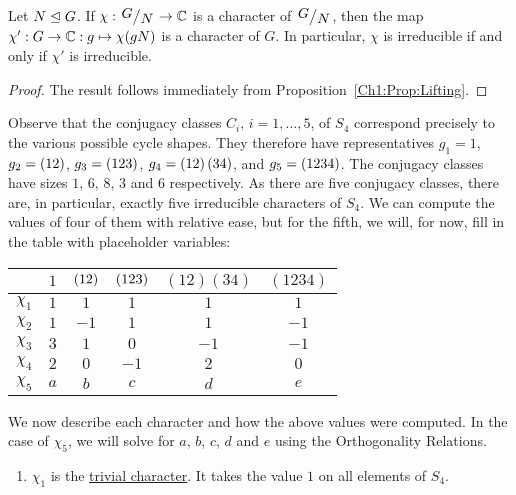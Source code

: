 \begin{proposition}\label{Ch2:Prop:Lifting_Chars}
    Let $N \trianglelefteq G$. If $\chi : \quotient{G}{N} \to \C$ is a character of $\quotient{G}{N}$, then the map $\chi' : G \to \mathbb{C} : g \mapsto \chi(gN)$ is a character of $G$. In particular, $\chi$ is irreducible if and only if $\chi'$ is irreducible.
\end{proposition}
\begin{proof}
    The result follows immediately from Proposition~\ref{Ch1:Prop:Lifting}.
\end{proof}

\begin{boxexample}[$S_4$]
    Observe that the conjugacy classes $C_i$, $i = 1, \ldots, 5$, of $S_4$ correspond precisely to the various possible cycle shapes. They therefore have representatives $g_1 = 1$, $g_2 = \left( 12 \right)$, $g_3 = \left( 123 \right)$, $g_4 = \left( 12 \right)\left( 34 \right)$, and $g_5 = \left( 1234 \right)$. The conjugacy classes have sizes $1$, $6$, $8$, $3$ and $6$ respectively. As there are five conjugacy classes, there are, in particular, exactly five irreducible characters of $S_4$. We can compute the values of four of them with relative ease, but for the fifth, we will, for now, fill in the table with placeholder variables:
    \begin{table}[H]
        \centering
        \begin{tabular}{c|ccccc}
            & $1$ & $\left( 12 \right)$ & $\left( 123 \right)$ & $(12)(34)$ & $(1234)$ \\
            \hline
            $\chi_1$ & $1$ & $1$ & $1$ & $1$ & $1$ \\
            $\chi_2$ & $1$ & $-1$ & $1$ & $1$ & $-1$ \\
            $\chi_3$ & $3$ & $1$ & $0$ & $-1$ & $-1$ \\
            $\chi_4$ & $2$ & $0$ & $-1$ & $2$ & $0$ \\
            $\chi_5$ & $a$ & $b$ & $c$ & $d$ & $e$
        \end{tabular}
    \end{table}
    We now describe each character and how the above values were computed. In the case of $\chi_5$, we will solve for $a$, $b$, $c$, $d$ and $e$ using the Orthogonality Relations.
    \begin{enumerate}
        \item $\chi_1$ is the \underline{trivial character}. It takes the value $1$ on all elements of $S_4$.
        

\end{enumerate}
\end{boxexample}

